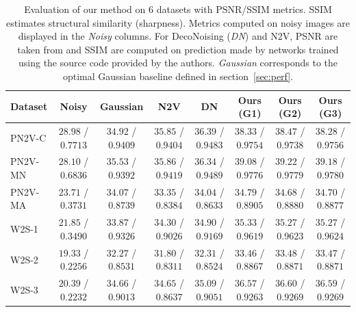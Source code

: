 \documentclass{article}
\begin{document}
\begin{table}[ht]
\caption{Evaluation of our method on 6 datasets with PSNR/SSIM metrics.
SSIM estimates structural similarity (sharpness).
Metrics computed on noisy images are displayed in the \textit{Noisy} columns. For DecoNoising (\textit{DN}) and N2V, PSNR are taken from \cite{goncharova2020} and SSIM are computed on prediction made by networks trained using the source code provided by the authors\protect\footnotemark. \textit{Gaussian} corresponds to the optimal Gaussian baseline defined in section~\ref{sec:perf}.}
\label{table:results}
\vskip -0.15in
\begin{center}
\begin{small}
\begin{sc}
\begin{tabular}{l@{\hskip 7.5pt}c@{\hskip 7.5pt}c@{\hskip 7.5pt}c@{\hskip 7.5pt}c@{\hskip 7.5pt}c@{\hskip 7.5pt}c@{\hskip 7.5pt}c}
\toprule
Dataset & Noisy & Gaussian & N2V & DN & Ours (G1) & Ours (G2) & Ours (G3) \\
\midrule
PN2V-C & $28.98$ / $0.7713$ & $34.92$ / $0.9409$ & $35.85$ / $0.9404$ & $36.39$ / $0.9483$ & $38.33$ / $0.9754$ & $38.47$ / $0.9738$ & $38.28$ / $0.9756$ \\
PN2V-MN & $28.10$ / $0.6836$ & $35.53$ / $0.9392$ & $35.86$ / $0.9419$ & $36.34$ / $0.9489$ & $39.08$ / $0.9776$ & $39.22$ / $0.9779$ & $39.18$ / $0.9780$ \\
PN2V-MA & $23.71$ / $0.3731$ & $34.07$ / $0.8739$ & $33.35$ / $0.8384$ & $34.04$ / $0.8633$ & $34.79$ / $0.8905$ & $34.68$ / $0.8880$ & $34.70$ / $0.8877$ \\
W2S-1 & $21.85$ / $0.3490$ & $33.87$ / $0.9326$ & $34.30$ / $0.9026$ & $34.90$ / $0.9169$ & $35.33$ / $0.9619$ & $35.27$ / $0.9623$ & $35.27$ / $0.9624$ \\
W2S-2 & $19.33$ / $0.2256$ & $32.27$ / $0.8531$ & $31.80$ / $0.8311$ & $32.31$ / $0.8524$ & $33.46$ / $0.8867$ & $33.48$ / $0.8871$ & $33.47$ / $0.8871$ \\
W2S-3 & $20.39$ / $0.2232$ & $34.66$ / $0.9013$ & $34.65$ / $0.8637$ & $35.09$ / $0.9051$ & $36.57$ / $0.9263$ & $36.60$ / $0.9269$ & $36.59$ / $0.9269$ \\
\bottomrule
\end{tabular}
\end{sc}
\end{small}
\end{center}
\vskip -0.2in
\end{table}
\end{document}
